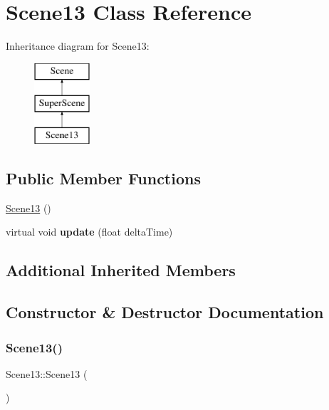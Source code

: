 \hypertarget{class_scene13}{}\section{Scene13 Class Reference}
\label{class_scene13}
Inheritance diagram for Scene13\+:\begin{figure}[H]
\begin{center}
\leavevmode
\includegraphics[height=3.000000cm]{class_scene13}
\end{center}
\end{figure}
\subsection*{Public Member Functions}
\begin{DoxyCompactItemize}
\item 
\hyperlink{class_scene13_a43fd3cea14e24f0b3e7d635d31e719bc}{Scene13} ()
\item 
\mbox{\label{class_scene13_a3f6efaad7fadbecbf7718f004390b2d6}} 
virtual void {\bfseries update} (float delta\+Time)
\end{DoxyCompactItemize}
\subsection*{Additional Inherited Members}


\subsection{Constructor \& Destructor Documentation}
\mbox{\label{class_scene13_a43fd3cea14e24f0b3e7d635d31e719bc}} 
\subsubsection{\texorpdfstring{Scene13()}{Scene13()}}
{\footnotesize\ttfamily Scene13\+::\+Scene13 (\begin{DoxyParamCaption}{ }\end{DoxyParamCaption})}

